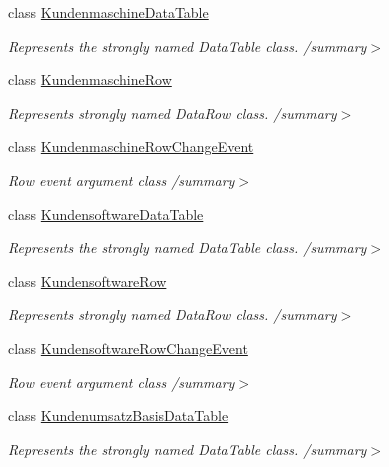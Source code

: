 \begin{DoxyCompactItemize}
class \hyperlink{class_products_1_1_data_1_1ds_sage_1_1_kundenmaschine_data_table}{Kundenmaschine\+Data\+Table}
\begin{DoxyCompactList}\small\item\em Represents the strongly named Data\+Table class. /summary$>$ \end{DoxyCompactList}\item 
class \hyperlink{class_products_1_1_data_1_1ds_sage_1_1_kundenmaschine_row}{Kundenmaschine\+Row}
\begin{DoxyCompactList}\small\item\em Represents strongly named Data\+Row class. /summary$>$ \end{DoxyCompactList}\item 
class \hyperlink{class_products_1_1_data_1_1ds_sage_1_1_kundenmaschine_row_change_event}{Kundenmaschine\+Row\+Change\+Event}
\begin{DoxyCompactList}\small\item\em Row event argument class /summary$>$ \end{DoxyCompactList}\item 
class \hyperlink{class_products_1_1_data_1_1ds_sage_1_1_kundensoftware_data_table}{Kundensoftware\+Data\+Table}
\begin{DoxyCompactList}\small\item\em Represents the strongly named Data\+Table class. /summary$>$ \end{DoxyCompactList}\item 
class \hyperlink{class_products_1_1_data_1_1ds_sage_1_1_kundensoftware_row}{Kundensoftware\+Row}
\begin{DoxyCompactList}\small\item\em Represents strongly named Data\+Row class. /summary$>$ \end{DoxyCompactList}\item 
class \hyperlink{class_products_1_1_data_1_1ds_sage_1_1_kundensoftware_row_change_event}{Kundensoftware\+Row\+Change\+Event}
\begin{DoxyCompactList}\small\item\em Row event argument class /summary$>$ \end{DoxyCompactList}\item 
class \hyperlink{class_products_1_1_data_1_1ds_sage_1_1_kundenumsatz_basis_data_table}{Kundenumsatz\+Basis\+Data\+Table}
\begin{DoxyCompactList}\small\item\em Represents the strongly named Data\+Table class. /summary$>$ \end{DoxyCompactList}\item 

\end{DoxyCompactItemize}
